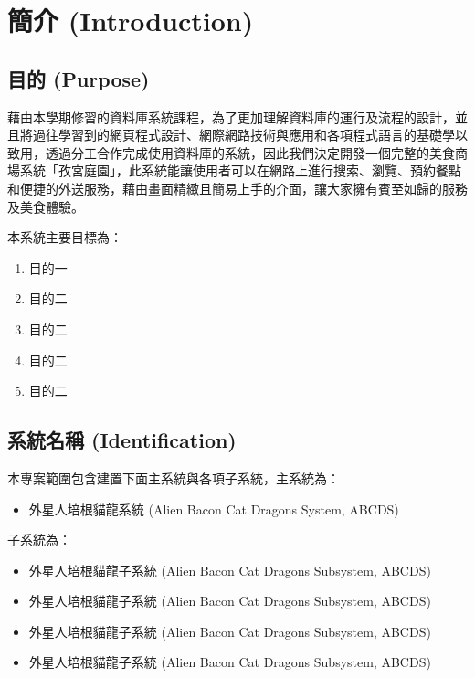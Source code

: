 \documentclass[a4paper, 12pt]{article}
\begin{document}

\section{簡介 (Introduction)}

\subsection{目的 (Purpose)}

藉由本學期修習的資料庫系統課程，為了更加理解資料庫的運行及流程的設計，並且將過往學習到的網頁程式設計、網際網路技術與應用和各項程式語言的基礎學以致用，透過分工合作完成使用資料庫的系統，因此我們決定開發一個完整的美食商場系統「孜宮庭園」，此系統能讓使用者可以在網路上進行搜索、瀏覽、預約餐點和便捷的外送服務，藉由畫面精緻且簡易上手的介面，讓大家擁有賓至如歸的服務及美食體驗。

\noindent 本系統主要目標為：
\begin{enumerate}
  \item 目的一
  \item 目的二
  \item 目的二
  \item 目的二
  \item 目的二
\end{enumerate}


\subsection{系統名稱 (Identification)}

\noindent 本專案範圍包含建置下面主系統與各項子系統，主系統為：

\begin{itemize}
  \item 外星人培根貓龍系統 (Alien Bacon Cat Dragons System, ABCDS)
\end{itemize}

\noindent 子系統為：

\begin{itemize}
  \item 外星人培根貓龍子系統 (Alien Bacon Cat Dragons Subsystem, ABCDS)
  \item 外星人培根貓龍子系統 (Alien Bacon Cat Dragons Subsystem, ABCDS)
  \item 外星人培根貓龍子系統 (Alien Bacon Cat Dragons Subsystem, ABCDS)
  \item 外星人培根貓龍子系統 (Alien Bacon Cat Dragons Subsystem, ABCDS)
\end{itemize}
\end{document}
